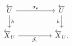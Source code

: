 \documentclass[a4paper,12pt,twoside]{report}
\begin{document}
 
\begin{equation}
    \begin{tikzcd}
    \overleftarrow{U} && \overleftarrow{U}\\
     \overleftarrow{X}_U && \overleftarrow{X}_U.
     \\
    \arrow["{\sigma_v}", from=1-1, to=1-3]
	\arrow["h"', from=1-3, to=2-3]
	\arrow["h", from=1-1, to=2-1]
	\arrow["{\tilde{g_v}}"', from=2-1, to=2-3]
\end{tikzcd}
\end{equation}
\end{document}
